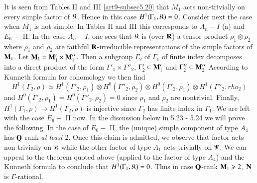 It is seen from Tables II and III \ref{art9-subsec5.20} that $M_1$ acts non-trivially on every simple factor of $\mathfrak{K}$. Hence in this case $H^1 (\Gamma_1, \mathfrak{K}) = 0$. Consider next the case when $M_1$ is not simple. In Tables II and III this corresponds to $A_n - I$ (a) and $E_6-$ II. In the case $A_n - I$, one sees that $\mathfrak{K}$ is (over $\mathbf{R}$) a tensor product $\rho_1 \otimes \rho_2$ where $\rho_1$ and $\rho_2$ are faithful $\mathbf{R}$-irreducible representations of the simple factors of $\mathbf{M}_1$. Let $\mathbf{M}_1 = \mathbf{M}'_1 \times \mathbf{M}''_1$. Then a subgroup $\Gamma_2$ of $\Gamma_1$ of finite index decomposes into a direct product of the form $\Gamma'_1 \times \Gamma''_2$, $\Gamma'_2 \subset \mathbf{M}'_1$ and $\Gamma''_2 \subset \mathbf{M}''_2$ According to Kunneth formula for cohomology we then find 
$$
H^1 (\Gamma_2, \rho) \simeq H^1 (\Gamma'_2 , \rho_1) \otimes H^0 (\Gamma''_2, \rho_2) \otimes H^0 (\Gamma'_2,\rho_1) \otimes H^1(\Gamma''_2, rho_2)
$$
and $H^0 (\Gamma'_2, \rho_1) = H^0 (\Gamma''_2, \rho_2) = 0$ since $\rho_1$ and $\rho_2$ are nontrivial. Finally, $H^1 (\Gamma_1, \rho) \to H^1 (\Gamma_2, \rho)$ is injective since $\Gamma_2$ has finite index in $\Gamma_1$. We are left with the case $E_6 - $ II now. In the discussion below in 5.23 - 5.24 we will prove the following. In the case of $E_6 - $ II, the (unique) simple component of type $A_4$ has $\mathbf{Q}$-rank \textit{at least} 2. Once this claim is admitted, we observe that factor acts non-trivially on $\mathfrak{K}$ while the other factor of type $A_1$ acts trivially on $\mathfrak{R}$. We can appeal to the theorem quoted above (applied to the factor of type $A_4$) and the Kunneth formula to conclude that $H^1 (\Gamma_1, \mathfrak{K}) =0$. Thus in case $\mathbf{Q}$-rank $\mathbf{M}_1 \geqslant 2$, $\mathbf{N}$ is $\Gamma$-rational.

